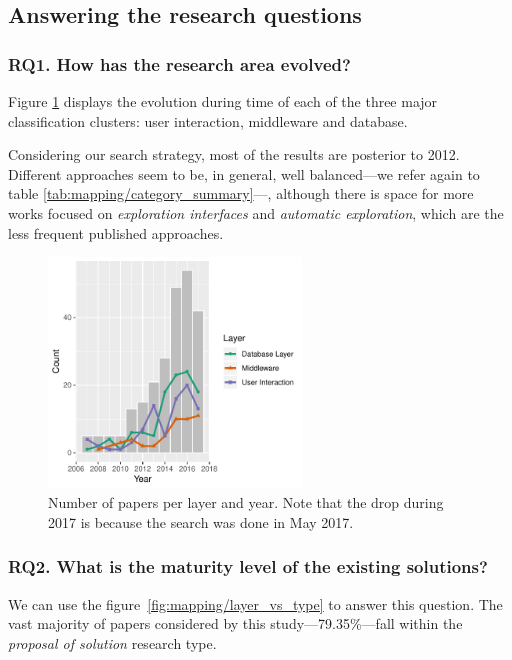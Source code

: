 \subsection{Answering the research questions}
\label{sec:mapping/answers}

\subsubsection{RQ1. How has the research area evolved?}
Figure \ref{fig:mapping/layers_histogram} displays the evolution during time
of each of the three major classification clusters: user interaction,
middleware and database.

Considering our search strategy, most of the
results are posterior to 2012. Different approaches seem to be, in general, well
balanced---we refer again to table \ref{tab:mapping/category_summary}---, although there
is space for more works focused on \emph{exploration interfaces} and
\emph{automatic exploration}, which are the less frequent published approaches.

\begin{figure}[hptb]
    \centering
    \includegraphics[width=0.6\textwidth]{images/3_mapping/layer_histogram}
    \caption[Number of studies per  layer and year.]{
        Number of papers per layer and year.
        Note that the drop during 2017 is because the search was done in May 2017.
    }
    \label{fig:mapping/layers_histogram}
\end{figure}

\subsubsection{RQ2. What is the maturity level of the existing solutions?}
We can use the figure~\ref{fig:mapping/layer_vs_type} to answer this question.
The vast majority of papers considered by this study---79.35\%---fall within the
\emph{proposal of solution} research type.

